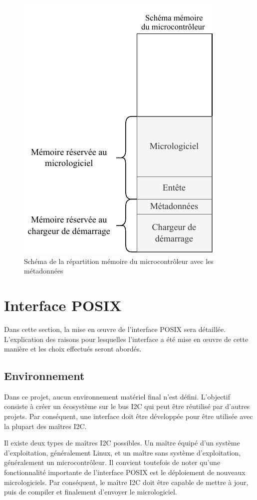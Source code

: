 \begin{figure}[H]
    \centering
    \includegraphics[scale=1.3]{./assets/figures/metadata.pdf}
    \caption{Schéma de la répartition mémoire du microcontrôleur avec les métadonnées}
\end{figure}

\section{Interface POSIX}

Dans cette section, la mise en \oe{}uvre de l'interface POSIX sera détaillée. L'explication des raisons pour lesquelles l'interface a été mise en \oe{}uvre de cette manière et les choix effectués seront abordés.

\subsection{Environnement}

Dans ce projet, aucun environnement matériel final n'est défini. L'objectif consiste à créer un écosystème sur le bus I2C qui peut être réutilisé par d'autres projets. Par conséquent, une interface doit être développée pour être utilisée avec la plupart des maîtres I2C.

Il existe deux types de maîtres I2C possibles. Un maître équipé d'un système d'exploitation, généralement Linux, et un maître sans système d'exploitation, généralement un microcontrôleur. Il convient toutefois de noter qu'une fonctionnalité importante de l'interface POSIX est le déploiement de nouveaux micrologiciels. Par conséquent, le maître I2C doit être capable de mettre à jour, puis de compiler et finalement d'envoyer le micrologiciel.

